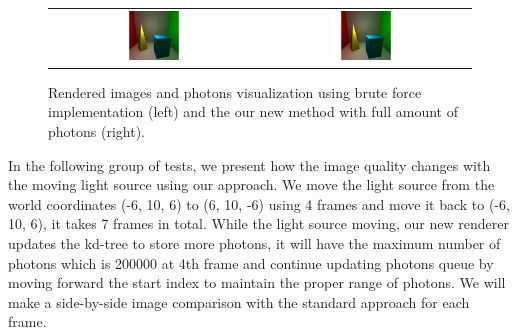\begin{figure}[htp]
\begin{center}
	\begin{tabular}{c | c}
		\includegraphics*[width=0.35\textwidth]{imgs/pq_frame9.pdf} &
		\includegraphics*[width=0.35\textwidth]{imgs/pq_ref.pdf}
	\end{tabular}
\renewcommand{\thefigure}{\thechapter.\arabic{figure}}
\caption[Comparison of images rendered by the brute force implementation and new approach with full amount of photons]{Rendered images and photons visualization using brute force implementation (left) and the our new method with full amount of photons (right). }
    \label{fig:new_vs_standard}
\end{center}
\end{figure}

In the following group of tests, we present how the image quality changes with the moving light source using our approach. We move the light source from the world coordinates (-6, 10, 6) to (6, 10, -6) using 4 frames and move it back to (-6, 10, 6), it takes 7 frames in total. While the light source moving, our new renderer updates the kd-tree to store more photons, it will have the maximum number of photons which is 200000 at 4th frame and continue updating photons queue by moving forward the start index to maintain the proper range of photons. We will make a side-by-side image comparison with the standard approach for each frame.   

